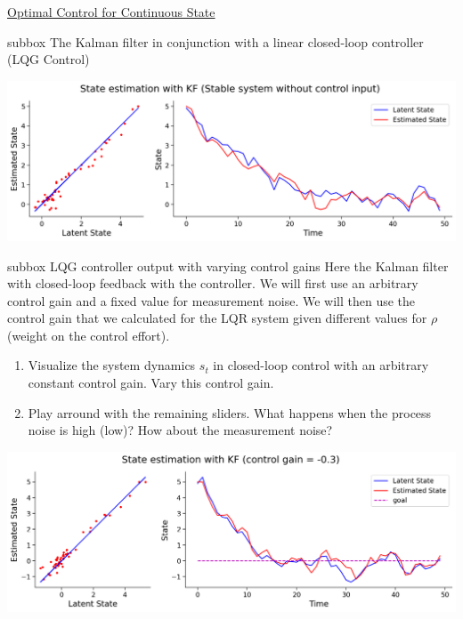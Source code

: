 \begin{textbox}{\href{https://compneuro.neuromatch.io/tutorials/W3D3_OptimalControl/student/W3D3_Tutorial2.html}{Optimal Control for Continuous State}}
\begin{subbox}{subbox}{  The Kalman filter in conjunction with a linear closed-loop controller (LQG Control)}
\scriptsize


\begin{center}
    
\includegraphics[scale=0.2]{Figures/OC/OC_Figure12.png}
\end{center}


\end{subbox}

\begin{subbox}{subbox}{  LQG controller output with varying control gains}
\scriptsize
Here the Kalman filter with closed-loop feedback with the controller. We will first use an arbitrary control gain and a fixed value for measurement noise. We will then use the control gain that we calculated for the LQR system given different values for $\rho$ (weight on the control effort).
\begin{enumerate}
    \item 
 Visualize the system dynamics $s_t$ in closed-loop control with an arbitrary constant control gain. Vary this control gain.

 \item  Play arround with the remaining sliders. What happens when the process noise is high (low)? How about the measurement noise?
\end{enumerate}

\begin{center}
    
\includegraphics[scale=0.2]{Figures/OC/OC_Figure13.png}
\end{center}



\end{subbox}
\end{textbox}

